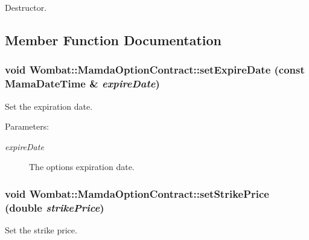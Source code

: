 Destructor. 



\subsection{Member Function Documentation}
\hypertarget{classWombat_1_1MamdaOptionContract_7d67a88fb7eda7351dd80ae12ba63735}{
\subsubsection[setExpireDate]{\setlength{\rightskip}{0pt plus 5cm}void Wombat::Mamda\-Option\-Contract::set\-Expire\-Date (const Mama\-Date\-Time \& {\em expire\-Date})}}
\label{classWombat_1_1MamdaOptionContract_7d67a88fb7eda7351dd80ae12ba63735}


Set the expiration date. 

\begin{Desc}
\item[Parameters:]
\begin{description}
\item[{\em expire\-Date}]The options expiration date. \end{description}
\end{Desc}
\hypertarget{classWombat_1_1MamdaOptionContract_57020e7c6f2c8d1bcd692b801714f966}{
\subsubsection[setStrikePrice]{\setlength{\rightskip}{0pt plus 5cm}void Wombat::Mamda\-Option\-Contract::set\-Strike\-Price (double {\em strike\-Price})}}
\label{classWombat_1_1MamdaOptionContract_57020e7c6f2c8d1bcd692b801714f966}


Set the strike price. 

